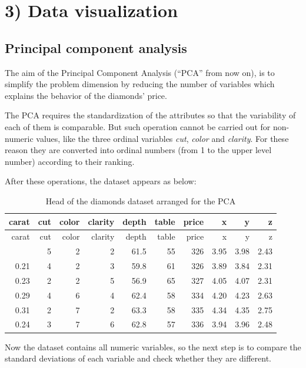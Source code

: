 \documentclass[
]{article}
\begin{document}
\section{3) Data visualization}\label{data-visualization}

\subsection{Principal component
analysis}\label{principal-component-analysis}

The aim of the Principal Component Analysis (``PCA'' from now on), is to
simplify the problem dimension by reducing the number of variables which
explains the behavior of the diamonds' price.

The PCA requires the standardization of the attributes so that the
variability of each of them is comparable. But such operation cannot be
carried out for non-numeric values, like the three ordinal variables
\emph{cut}, \emph{color} and \emph{clarity}. For these reason they are
converted into ordinal numbers (from 1 to the upper level number)
according to their ranking.

After these operations, the dataset appears as below:

\begin{longtable}[]{@{}rrrrrrrrrr@{}}
\caption{Head of the diamonds dataset arranged for the
PCA}\tabularnewline
\toprule\noalign{}
carat & cut & color & clarity & depth & table & price & x & y & z \\
\midrule\noalign{}
\endfirsthead
\toprule\noalign{}
carat & cut & color & clarity & depth & table & price & x & y & z \\
\midrule\noalign{}
\endhead
\bottomrule\noalign{}
\endlastfoot
0.23 & 5 & 2 & 2 & 61.5 & 55 & 326 & 3.95 & 3.98 & 2.43 \\
0.21 & 4 & 2 & 3 & 59.8 & 61 & 326 & 3.89 & 3.84 & 2.31 \\
0.23 & 2 & 2 & 5 & 56.9 & 65 & 327 & 4.05 & 4.07 & 2.31 \\
0.29 & 4 & 6 & 4 & 62.4 & 58 & 334 & 4.20 & 4.23 & 2.63 \\
0.31 & 2 & 7 & 2 & 63.3 & 58 & 335 & 4.34 & 4.35 & 2.75 \\
0.24 & 3 & 7 & 6 & 62.8 & 57 & 336 & 3.94 & 3.96 & 2.48 \\
\end{longtable}

Now the dataset contains all numeric variables, so the next step is to
compare the standard deviations of each variable and check whether they
are different.
\end{document}

